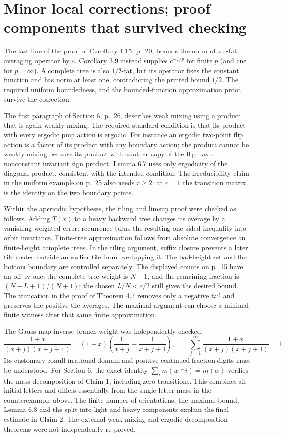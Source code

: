 \documentclass[10pt]{article}
\begin{document}
\section*{Minor local corrections; proof components that survived checking}
The last line of the proof of Corollary 4.15, p. 20, bounds the norm of a \(c\)-fat averaging operator by \(c\). Corollary 3.9 instead supplies \(c^{-1/p}\) for finite \(p\) (and one for \(p=\infty\)). A complete tree is also \(1/2\)-fat, but its operator fixes the constant function and has norm at least one, contradicting the printed bound \(1/2\). The required uniform boundedness, and the bounded-function approximation proof, survive the correction.\par
The first paragraph of Section 6, p. 26, describes weak mixing using a product that is again weakly mixing. The required standard condition is that its product with every ergodic pmp action is ergodic. For instance an ergodic two-point flip action is a factor of its product with any boundary action; the product cannot be weakly mixing because its product with another copy of the flip has a nonconstant invariant sign product. Lemma 6.7 uses only ergodicity of the diagonal product, consistent with the intended condition. The irreducibility claim in the uniform example on p. 25 also needs \(r\ge2\): at \(r=1\) the transition matrix is the identity on the two boundary points.\par
Within the aperiodic hypotheses, the tiling and limsup proof were checked as follows. Adding \(T(x)\) to a heavy backward tree changes its average by a vanishing weighted error; recurrence turns the resulting one-sided inequality into orbit invariance. Finite-tree approximation follows from absolute convergence on finite-height complete trees. In the tiling argument, suffix closure prevents a later tile rooted outside an earlier tile from overlapping it. The bad-height set and the bottom boundary are controlled separately. The displayed counts on p. 15 have an off-by-one: the complete-tree weight is \(N+1\), and the remaining fraction is \((N-L+1)/(N+1)\); the chosen \(L/N<\varepsilon/2\) still gives the desired bound. The truncation in the proof of Theorem 4.7 removes only a negative tail and preserves the positive tile averages. The maximal argument can choose a minimal finite witness after that same finite approximation.\par
The Gauss-map inverse-branch weight was independently checked: \[\frac{1+x}{(x+j)(x+j+1)}
  =(1+x)\left(\frac1{x+j}-\frac1{x+j+1}\right),
 \qquad \sum_{j=1}^\infty\frac{1+x}{(x+j)(x+j+1)}=1.\] Its customary conull irrational domain and positive continued-fraction digits must be understood. For Section 6, the exact identity \(\sum_i m(w\,^{\frown}i)=m(w)\) verifies the mass decomposition of Claim 1, including zero transitions. This combines all initial letters and differs essentially from the single-letter mass in the counterexample above. The finite number of orientations, the maximal bound, Lemma 6.8 and the split into light and heavy components explain the final estimate in Claim 2. The external weak-mixing and ergodic-decomposition theorems were not independently re-proved.\par
\end{document}
